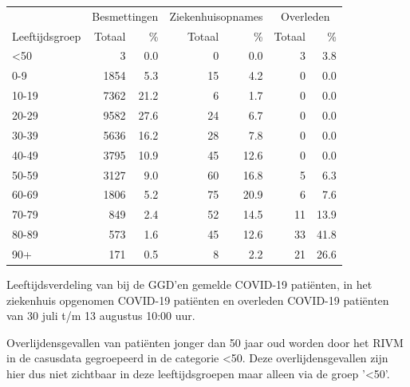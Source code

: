 \documentclass[
  english,
  man,floatsintext]{apa6}
\begin{document}
\begin{table}
\centering\begingroup\fontsize{11}{13}\selectfont

\begin{threeparttable}
\begin{tabular}{lrrrrrr}
\toprule
\multicolumn{1}{c}{ } & \multicolumn{2}{c}{Besmettingen} & \multicolumn{2}{c}{Ziekenhuisopnames} & \multicolumn{2}{c}{Overleden} \\
\cmidrule(l{3pt}r{3pt}){2-3} \cmidrule(l{3pt}r{3pt}){4-5} \cmidrule(l{3pt}r{3pt}){6-7}
Leeftijdsgroep & Totaal & \% & Totaal & \% & Totaal & \%\\
\midrule
<50 & 3 & 0.0 & 0 & 0.0 & 3 & 3.8\\
0-9 & 1854 & 5.3 & 15 & 4.2 & 0 & 0.0\\
10-19 & 7362 & 21.2 & 6 & 1.7 & 0 & 0.0\\
20-29 & 9582 & 27.6 & 24 & 6.7 & 0 & 0.0\\
30-39 & 5636 & 16.2 & 28 & 7.8 & 0 & 0.0\\
40-49 & 3795 & 10.9 & 45 & 12.6 & 0 & 0.0\\
50-59 & 3127 & 9.0 & 60 & 16.8 & 5 & 6.3\\
60-69 & 1806 & 5.2 & 75 & 20.9 & 6 & 7.6\\
70-79 & 849 & 2.4 & 52 & 14.5 & 11 & 13.9\\
80-89 & 573 & 1.6 & 45 & 12.6 & 33 & 41.8\\
90+ & 171 & 0.5 & 8 & 2.2 & 21 & 26.6\\
\bottomrule
\end{tabular}
\begin{tablenotes}
\item[1] Leeftijdsverdeling van bij de GGD’en gemelde COVID-19 patiënten, in het ziekenhuis opgenomen COVID-19 patiënten en overleden COVID-19 patiënten van 30 juli t/m 13 augustus 10:00 uur.
\item[2] Overlijdensgevallen van patiënten jonger dan 50 jaar oud worden door het RIVM in de casusdata gegroepeerd in de categorie <50. Deze overlijdensgevallen zijn hier dus niet zichtbaar in deze leeftijdsgroepen maar alleen via de groep '<50'.
\end{tablenotes}
\end{threeparttable}
\endgroup{}
\end{table}

\newpage
\end{document}

